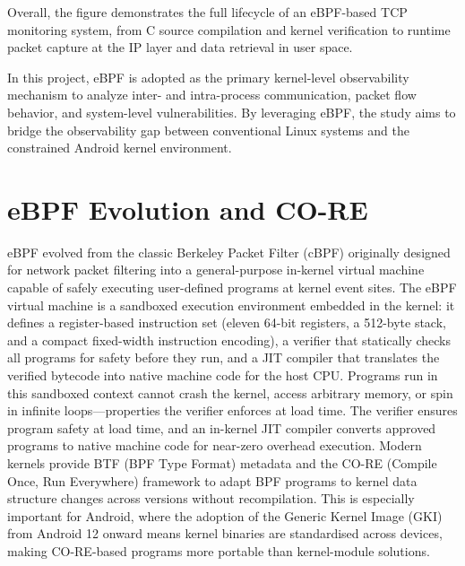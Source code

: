 \documentclass{mnitjaipur}
\begin{document}
Overall, the figure demonstrates the full lifecycle of an eBPF-based TCP monitoring system, from C source compilation and kernel verification to runtime packet capture at the IP layer and data retrieval in user space.

\noindent
In this project, eBPF is adopted as the primary kernel-level observability mechanism to analyze inter- and intra-process communication, packet flow behavior, and system-level vulnerabilities. By leveraging eBPF, the study aims to bridge the observability gap between conventional Linux systems and the constrained Android kernel environment.


\section{eBPF Evolution and CO-RE}
eBPF evolved from the classic Berkeley Packet Filter (cBPF) originally designed for network packet filtering into a general-purpose in-kernel virtual machine capable of safely executing user-defined programs at kernel event sites. The eBPF virtual machine is a sandboxed execution environment embedded in the kernel: it defines a register-based instruction set (eleven 64-bit registers, a 512-byte stack, and a compact fixed-width instruction encoding), a verifier that statically checks all programs for safety before they run, and a JIT compiler that translates the verified bytecode into native machine code for the host CPU. Programs run in this sandboxed context cannot crash the kernel, access arbitrary memory, or spin in infinite loops---properties the verifier enforces at load time. The verifier ensures program safety at load time, and an in-kernel JIT compiler converts approved programs to native machine code for near-zero overhead execution. Modern kernels provide BTF (BPF Type Format) metadata and the CO-RE (Compile Once, Run Everywhere) framework to adapt BPF programs to kernel data structure changes across versions without recompilation.\cite{mccanne1993bpf,starovoitov_bpf,ebpf_linux_doc,libbpf_doc} This is especially important for Android, where the adoption of the Generic Kernel Image (GKI) from Android 12 onward means kernel binaries are standardised across devices, making CO-RE-based programs more portable than kernel-module solutions.
\end{document}

